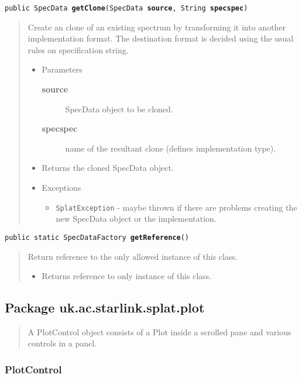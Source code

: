 \documentclass[twoside,11pt,nolof]{starlink}
\providecommand{\entityintro}[3]{
  \htmlref{\textbf{\Large{#1}}}{#2}
  \dotfill\pageref{#2}
  \begin{quote}
  #3
  \end{quote}
}
\providecommand{\startsection}[4]{
   \subsubsection{\label{#3}{#2}}
   #4
}
\providecommand{\method}[1]{\texttt{#1}}
\newenvironment{desc}{\begin{quote}}{\end{quote}}
\begin{document}
\method{public SpecData
\textbf{getClone}(\texttt{SpecData}
        \textbf{source},
        \texttt{String} \textbf{specspec})\label{l125}\label{l126}}
\begin{desc}Create an clone of an existing spectrum by transforming it into
 another implementation format. The destination format is
 decided using the usual rules on specification string.
\begin{itemize}
\item{Parameters
  \begin{description}
   \item[\textbf{source}]{SpecData object to be cloned.}
   \item[\textbf{specspec}]{name of the resultant clone (defines
                 implementation type).}
  \end{description}}
\end{itemize}
\begin{itemize}
\item{Returns the cloned SpecData object. }
\item{{Exceptions}
  \begin{itemize}
   \item{\vspace{-.6ex}\texttt{SplatException} - maybe thrown if there are problems
            creating the new SpecData object or the implementation.}
  \end{itemize}
}
\end{itemize}
\end{desc}

\method{public static SpecDataFactory \textbf{getReference}()\label{l127}\label{l128}}
\begin{desc}Return reference to the only allowed instance of this class.
\begin{itemize}
\item{Returns reference to only instance of this class. }
\end{itemize}
\end{desc}

\clearpage


\subsection{Package uk.ac.starlink.splat.plot}

\entityintro{PlotControl}{l129}{A PlotControl object consists of a Plot inside a scrolled pane and
 various controls in a panel.}
\clearpage
\startsection{Class}{PlotControl}{l129}
\end{document}
